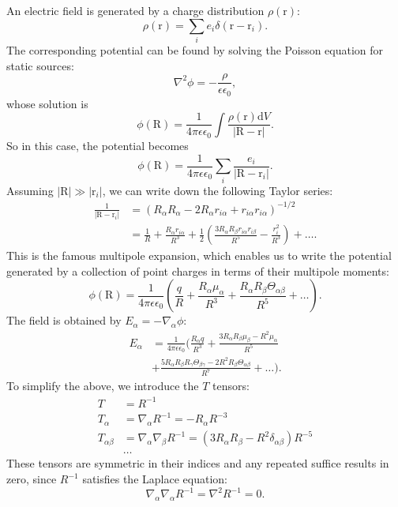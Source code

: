 \documentclass[amsmath,amssymb,notitlepage,11pt,reprint,aip]{revtex4-1}
\newcommand{\bvec}[1]{\bm{\mathrm{#1}}}
\newcommand{\dl}{\mathrm{d}}
\begin{document}
An electric field is generated by a charge distribution $\rho(\bvec{r})$:
\begin{equation}
    \rho(\bvec{r}) = \sum_ie_i\delta(\bvec{r}-\bvec{r}_i).
\end{equation}
The corresponding potential can be found by solving the Poisson equation for static sources:
\begin{equation}
    \nabla^2\phi=-\frac{\rho}{\epsilon\epsilon_0},
\end{equation}
whose solution is
\begin{equation}
    \phi(\bvec{R}) = \frac{1}{4\pi\epsilon\epsilon_0}\int\frac{\rho(\bvec{r})\dl V}{|\bvec{R}-\bvec{r}|}.
\end{equation}
So in this case, the potential becomes
\begin{equation}
    \phi(\bvec{R}) = \frac{1}{4\pi\epsilon\epsilon_0}\sum_i\frac{e_i}{|\bvec{R}-\bvec{r}_i|}.
\end{equation}
Assuming $|\bvec{R}|\gg|\bvec{r}_i|$, we can write down the following Taylor series:
\begin{align}
    \frac{1}{|\bvec{R}-\bvec{r}_i|} &= (R_{\alpha}R_{\alpha}-2R_{\alpha}r_{i\alpha}+r_{i\alpha}r_{i\alpha})^{-1/2} \\
    &= \frac{1}{R} + \frac{R_{\alpha}r_{i\alpha}}{R^3} + \frac{1}{2}\left(\frac{3R_{\alpha}R_{\beta}r_{i\alpha}r_{i\beta}}{R^5}-\frac{r_{i}^2}{R^3}\right) + \dots.\nonumber
\end{align}
This is the famous multipole expansion, which enables us to write the potential generated by a collection of point charges in terms of their multipole moments:
\begin{equation}
    \phi(\bvec{R}) = \frac{1}{4\pi\epsilon\epsilon_0}\left(\frac{q}{R} + \frac{R_{\alpha}\mu_{\alpha}}{R^3} + \frac{R_{\alpha}R_{\beta}\Theta_{\alpha\beta}}{R^5} + \dots\right).
\end{equation}
The field is obtained by $E_{\alpha}=-\nabla_{\alpha}\phi$:
\begin{align}
    E_{\alpha} &= \frac{1}{4\pi\epsilon\epsilon_0}\biggl(\frac{R_{\alpha}q}{R^3} + \frac{3R_{\alpha}R_{\beta}\mu_{\beta}-R^2\mu_{\alpha}}{R^5} \\
    &+ \frac{5R_{\alpha}R_{\beta}R_{\gamma}\Theta_{\beta\gamma}-2R^2R_{\beta}\Theta_{\alpha\beta}}{R^7} + \dots\biggr).
\end{align}
To simplify the above, we introduce the $T$ tensors:
\begin{align}
    T&=R^{-1}\\
    T_{\alpha}&=\nabla_{\alpha}R^{-1}=-R_{\alpha}R^{-3}\\
    T_{\alpha\beta}&=\nabla_{\alpha}\nabla_{\beta}R^{-1}=(3R_{\alpha}R_{\beta}-R^2\delta_{\alpha\beta})R^{-5}\\
    &\dots\nonumber
\end{align}
These tensors are symmetric in their indices and any repeated suffice results in zero, since $R^{-1}$ satisfies the Laplace equation:
\begin{equation}
    \nabla_{\alpha}\nabla_{\alpha}R^{-1} = \nabla^2R^{-1} = 0.
\end{equation}


\end{document}
